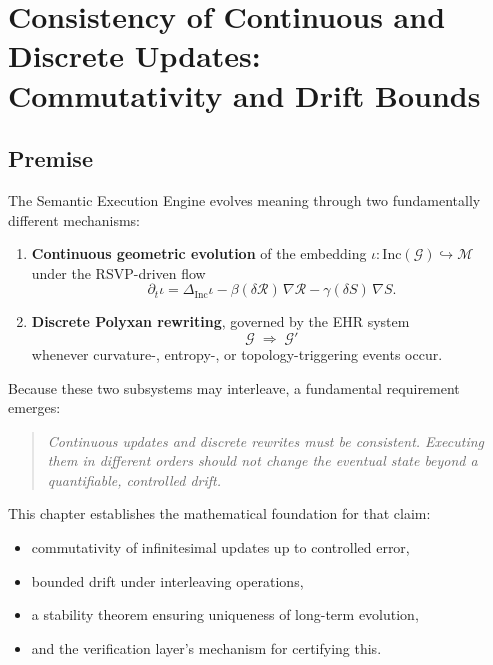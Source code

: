 \chapter{Consistency of Continuous and Discrete Updates:\\
Commutativity and Drift Bounds}
\label{ch:75}

\section{Premise}

The Semantic Execution Engine evolves meaning through two fundamentally
different mechanisms:

\begin{enumerate}
\item \textbf{Continuous geometric evolution}  
      of the embedding $\iota : \mathrm{Inc}(\mathcal{G}) \hookrightarrow \mathcal{M}$  
      under the RSVP-driven flow
      \[
        \partial_t \iota
          = \Delta_{\mathrm{Inc}} \iota
            - \beta(\delta \mathcal{R})\,\nabla\mathcal{R}
            - \gamma(\delta S)\,\nabla S.
      \]

\item \textbf{Discrete Polyxan rewriting},  
      governed by the EHR system
      \[
        \mathcal{G} \;\Rightarrow\; \mathcal{G}'
      \]
      whenever curvature-, entropy-, or topology-triggering events occur.
\end{enumerate}

Because these two subsystems may interleave, a fundamental requirement emerges:

\begin{quote}
\emph{Continuous updates and discrete rewrites must be consistent.  
Executing them in different orders should not change the eventual state  
beyond a quantifiable, controlled drift.}
\end{quote}

This chapter establishes the mathematical foundation for that claim:

\begin{itemize}
\item commutativity of infinitesimal updates up to controlled error,  
\item bounded drift under interleaving operations,  
\item a stability theorem ensuring uniqueness of long-term evolution,  
\item and the verification layer’s mechanism for certifying this.
\end{itemize}


